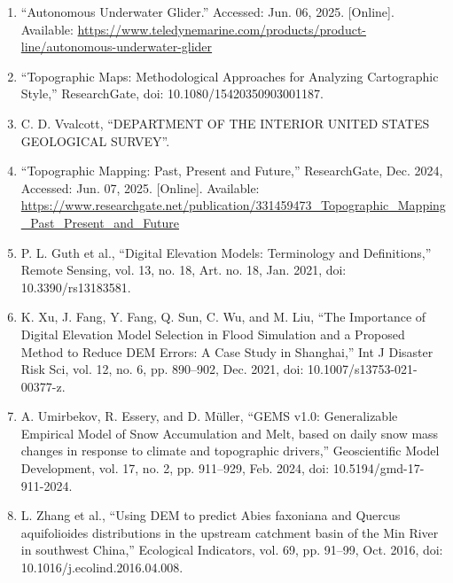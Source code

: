 \documentclass{article}
\begin{document}
\begin{sloppypar}
\begin{enumerate}
    \item{“Autonomous Underwater Glider.” Accessed: Jun. 06, 2025. [Online]. Available: \url{https://www.teledynemarine.com/products/product-line/autonomous-underwater-glider}}

    \item{“Topographic Maps: Methodological Approaches for Analyzing Cartographic Style,” ResearchGate, doi: 10.1080/15420350903001187.}

    \item{C. D. Vvalcott, “DEPARTMENT OF THE INTERIOR UNITED STATES GEOLOGICAL SURVEY”.}

    \item{“Topographic Mapping: Past, Present and Future,” ResearchGate, Dec. 2024, Accessed: Jun. 07, 2025. [Online]. Available: \url{https://www.researchgate.net/publication/331459473_Topographic_Mapping_Past_Present_and_Future}}

    \item{P. L. Guth et al., “Digital Elevation Models: Terminology and Definitions,” Remote Sensing, vol. 13, no. 18, Art. no. 18, Jan. 2021, doi: 10.3390/rs13183581.}

    \item{K. Xu, J. Fang, Y. Fang, Q. Sun, C. Wu, and M. Liu, “The Importance of Digital Elevation Model Selection in Flood Simulation and a Proposed Method to Reduce DEM Errors: A Case Study in Shanghai,” Int J Disaster Risk Sci, vol. 12, no. 6, pp. 890–902, Dec. 2021, doi: 10.1007/s13753-021-00377-z.}

    \item{A. Umirbekov, R. Essery, and D. Müller, “GEMS v1.0: Generalizable Empirical Model of Snow Accumulation and Melt, based on daily snow mass changes in response to climate and topographic drivers,” Geoscientific Model Development, vol. 17, no. 2, pp. 911–929, Feb. 2024, doi: 10.5194/gmd-17-911-2024.}

    \item{L. Zhang et al., “Using DEM to predict Abies faxoniana and Quercus aquifolioides distributions in the upstream catchment basin of the Min River in southwest China,” Ecological Indicators, vol. 69, pp. 91–99, Oct. 2016, doi: 10.1016/j.ecolind.2016.04.008.}

\end{enumerate}
\end{sloppypar}

\end{document}

